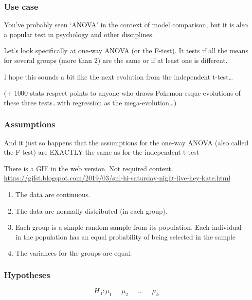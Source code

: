 \documentclass[
]{book}
\providecommand{\tightlist}{%
  \setlength{\itemsep}{0pt}\setlength{\parskip}{0pt}}
\begin{document}
\hypertarget{use-case-2}{%
\subsubsection{Use case}\label{use-case-2}}

You've probably seen `ANOVA' in the context of model comparison, but it is also a popular test in psychology and other disciplines.

Let's look specifically at one-way ANOVA (or the F-test). It tests if all the means for several groups (more than 2) are the same or if at least one is different.

I hope this sounds a bit like the next evolution from the independent t-test\ldots{}

(+ 1000 stats respect points to anyone who draws Pokemon-esque evolutions of these three tests\ldots with regression as the mega-evolution\ldots)

\hypertarget{assumptions-2}{%
\subsubsection{Assumptions}\label{assumptions-2}}

And it just so happens that the assumptions for the one-way ANOVA (also called the F-test) are EXACTLY the same as for the independent t-test

There is a GIF in the web version. Not required content. \url{https://gifst.blogspot.com/2019/03/snl-hi-saturday-night-live-hey-kate.html}

\begin{enumerate}
\def\labelenumi{\arabic{enumi}.}
\tightlist
\item
  The data are continuous.
\item
  The data are normally distributed (in each group).
\item
  Each group is a simple random sample from its population. Each individual in the population has an equal probability of being selected in the sample
\item
  The variances for the groups are equal.
\end{enumerate}

\hypertarget{hypotheses-2}{%
\subsubsection{Hypotheses}\label{hypotheses-2}}

\[H_0: \mu_1 = \mu_2 = ... = \mu_k \]
\end{document}
